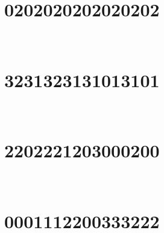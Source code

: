 

\,
\newline
\vspace{1.2cm}

\section{0202020202020202}

\marginnote[3\baselineskip]{\centering}



\,
\newline
\vspace{1.2cm}

\section{3231323131013101}

\marginnote[3\baselineskip]{\centering}



\,
\newline
\vspace{1.2cm}

\section{2202221203000200}

\marginnote[3\baselineskip]{\centering}



\,
\newline
\vspace{1.2cm}

\section{0001112200333222}

\marginnote[3\baselineskip]{\centering}



